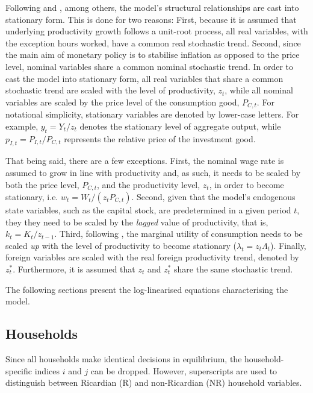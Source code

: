 \documentclass[a4paper,11pt]{article}
\numberwithin{equation}{section}
\begin{document}
	Following \cite{christoffel2008} and \cite{adolfson2007}, among others, the model's structural relationships are cast into stationary form. This is done for two reasons: First, because it is assumed that underlying productivity growth follows a unit-root process, all real variables, with the exception hours worked, have a common real stochastic trend. Second, since the main aim of monetary policy is to stabilise inflation as opposed to the price level, nominal variables share a common nominal stochastic trend. In order to cast the model into stationary form, all real variables that share a common stochastic trend are scaled with the level of productivity, $z_t$, while all nominal variables are scaled by the price level of the consumption good, $P_{C,t}$. For notational simplicity, stationary variables are denoted by lower-case letters. For example, $y_t=Y_t/z_t$ denotes the stationary level of aggregate output, while $p_{I,t}=P_{I,t}/P_{C,t}$ represents the relative price of the investment good.
	
	
	That being said, there are a few exceptions. First, the nominal wage rate is assumed to grow in line with productivity and, as such, it needs to be scaled by both the price level, $P_{C,t}$, and the productivity level, $z_t$, in order to become stationary, i.e. $w_t = W_t/(z_t P_{C,t})$. Second, given that the model's endogenous state variables, such as the capital stock, are predetermined in a given period $t$, they they need to be scaled by the \textit{lagged} value of productivity, that is, $k_t = K_t/z_{t-1}$. Third, following \cite{christoffel2008}, the marginal utility of consumption needs to be scaled \textit{up} with the level of productivity to become stationary ($\lambda_t = z_t\Lambda_t$). Finally, foreign variables are scaled with the real foreign productivity trend, denoted by $z_t^*$. Furthermore, it is assumed that $z_t$ and $z_t^*$ share the same stochastic trend. 
	
	The following sections present the log-linearised equations characterising the model.
	
	\subsection{Households}
	
	Since all households make identical decisions in equilibrium, the household-specific indices $i$ and $j$ can be dropped. However, superscripts are used to distinguish between Ricardian (R) and non-Ricardian (NR) household variables. 
	
\end{document}
